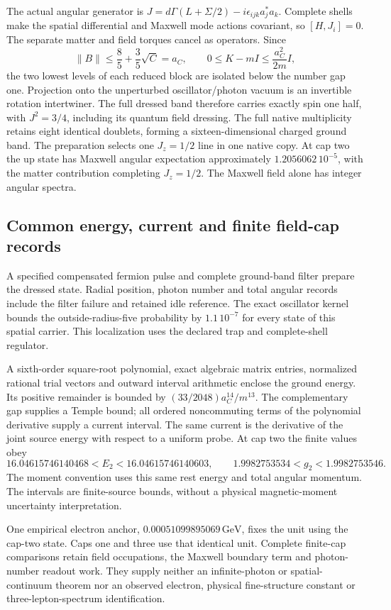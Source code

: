 The actual angular generator is
$J=d\Gamma(L+\Sigma/2)-i\epsilon_{ijk}a_j^*a_k$.
Complete shells make the spatial differential and Maxwell mode actions
covariant, so $[H,J_i]=0$. The separate matter and field torques cancel
as operators. Since
\[
 \|B\|\le\frac85+\frac35\sqrt C=a_C,\qquad
 0\le K-mI\le\frac{a_C^2}{2m}I,
\]
the two lowest levels of each reduced block are isolated below the number
gap one. Projection onto the unperturbed oscillator/photon vacuum is an
invertible rotation intertwiner. The full dressed band therefore carries
exactly spin one half, with $J^2=3/4$, including its quantum field dressing.
The full native multiplicity retains eight identical doublets, forming a
sixteen-dimensional charged ground band. The preparation selects one
$J_z=1/2$ line in one native copy.
At cap two the up state has Maxwell angular expectation approximately
$1.2056062\,10^{-5}$, with the matter contribution completing $J_z=1/2$.
The Maxwell field alone has integer angular spectra.

\subsection{Common energy, current and finite field-cap records}

A specified compensated fermion pulse and complete ground-band filter
prepare the dressed state. Radial position, photon number and total angular
records include the filter failure and retained idle reference. The exact
oscillator kernel bounds the outside-radius-five probability by
$1.1\,10^{-7}$ for every state of this spatial carrier. This localization
uses the declared trap and complete-shell regulator.

A sixth-order square-root polynomial, exact algebraic matrix entries,
normalized rational trial vectors and outward interval arithmetic enclose
the ground energy. Its positive remainder is bounded by
$(33/2048)a_C^{14}/m^{13}$. The complementary gap supplies a Temple bound;
all ordered noncommuting terms of the polynomial derivative supply a
current interval. The same current is the derivative of the joint source
energy with respect to a uniform probe. At cap two the finite values obey
\[
 16.04615746140468<E_2<16.04615746140603,\qquad
 1.9982753534<g_2<1.9982753546.
\]
The moment convention uses this same rest energy and total angular
momentum. The intervals are finite-source bounds, without a physical
magnetic-moment uncertainty interpretation.

One empirical electron anchor, $0.00051099895069\,\mathrm{GeV}$, fixes the
unit using the cap-two state. Caps one and three use that identical unit.
Complete finite-cap comparisons retain field occupations, the Maxwell
boundary term and photon-number readout work. They supply neither an
infinite-photon or spatial-continuum theorem nor an observed electron,
physical fine-structure constant or three-lepton-spectrum identification.


